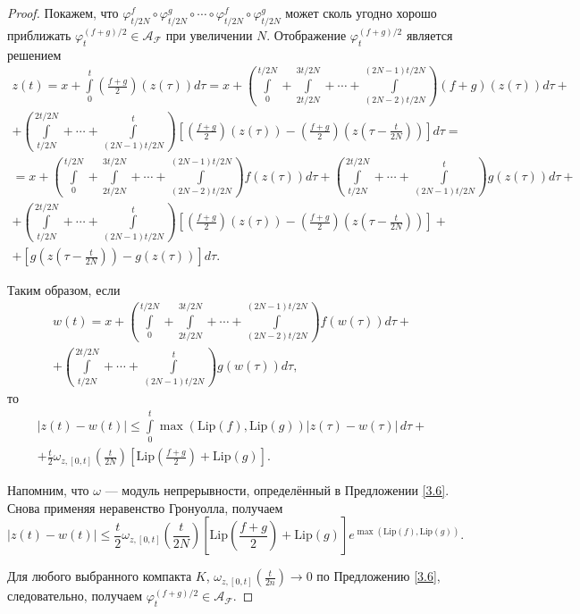 \documentclass[../NDCNNAI_main.tex]{subfiles}
\begin{document}
\begin{proof}
Покажем, что \(\varphi_{t/2N}^f \circ \varphi_{t/2N}^g \circ \cdots \circ \varphi_{t/2N}^f \circ \varphi_{t/2N}^g\) может сколь угодно хорошо приближать \(\varphi_t^{(f+g)/2} \in \mathcal{A}_{\mathcal{F}}\) при увеличении \(N\). Отображение \(\varphi_t^{(f+g)/2}\) является решением
\begin{multline*}
    z(t) = x + \int\limits_{0}^{t} \left( \frac{f + g}{2} \right) (z(\tau)) d\tau = x + \left( \int\limits_{0}^{t/2N} + \int\limits_{2t/2N}^{3t/2N} + \cdots + \int\limits_{(2N-2)t/2N}^{(2N-1)t/2N} \right) (f + g)(z(\tau)) d\tau + \\
    + \left( \int\limits_{t/2N}^{2t/2N} + \cdots + \int\limits_{(2N-1)t/2N}^{t} \right) \left[ \left( \frac{f + g}{2} \right) (z(\tau)) - \left( \frac{f + g}{2} \right) \left( z \left( \tau - \frac{t}{2N} \right) \right) \right] d\tau = \\
    = x + \left( \int\limits_{0}^{t/2N} + \int\limits_{2t/2N}^{3t/2N} + \cdots + \int\limits_{(2N-2)t/2N}^{(2N-1)t/2N} \right) f(z(\tau)) d\tau + \left( \int\limits_{t/2N}^{2t/2N} + \cdots + \int\limits_{(2N-1)t/2N}^{t}\right) g(z(\tau)) d\tau + \\
    + \left( \int\limits_{t/2N}^{2t/2N} + \cdots + \int\limits_{(2N-1)t/2N}^{t} \right) \left[ \left( \frac{f + g}{2} \right) (z(\tau)) - \left( \frac{f + g}{2} \right) \left( z \left( \tau - \frac{t}{2N} \right) \right) \right] + \\
    + \left[ g \left( z \left( \tau - \frac{t}{2N} \right) \right) - g(z(\tau)) \right] d\tau.
\end{multline*}

Таким образом, если
\begin{multline*}
    w(t) = x + \left( \int\limits_{0}^{t/2N} + \int\limits_{2t/2N}^{3t/2N} + \cdots + \int\limits_{(2N-2)t/2N}^{(2N-1)t/2N} \right) f(w(\tau)) d\tau +\\
    + \left( \int\limits_{t/2N}^{2t/2N} + \cdots + \int\limits_{(2N-1)t/2N}^{t}\right) g(w(\tau)) d\tau,
\end{multline*}
то
\begin{multline*}
    |z(t) - w(t)| \leq \int\limits_{0}^{t} \max(\mathrm{Lip}(f), \mathrm{Lip}(g))|z(\tau) - w(\tau)| \, d\tau + \\ 
    + \frac{t}{2}\omega_{z,[0,t]} \left( \frac{t}{2N} \right) \left[ \mathrm{Lip} \left( \frac{f + g}{2} \right) + \mathrm{Lip}(g) \right].
\end{multline*}

Напомним, что \(\omega\) --- модуль непрерывности, определённый в Предложении \ref{3.6}. Снова применяя неравенство Гронуолла, получаем
\[
|z(t) - w(t)| \leq \frac{t}{2}\omega_{z,[0,t]} \left( \frac{t}{2N} \right) \left[ \mathrm{Lip} \left( \frac{f + g}{2} \right) + \mathrm{Lip}(g) \right] e^{\max(\mathrm{Lip}(f), \mathrm{Lip}(g))}.
\]

Для любого выбранного компакта \(K\), \(\omega_{z,[0,t]} (\frac{t}{2n}) \to 0\) по Предложению \ref{3.6}, следовательно, получаем \(\varphi_{t}^{(f+g)/2} \in \mathcal{A}_{\mathcal{F}}\).
\end{proof}
\end{document}
